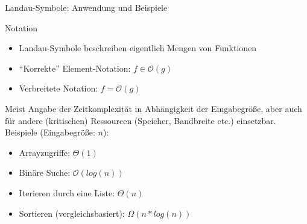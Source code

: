 \begin{frame}{Landau-Symbole: Anwendung und Beispiele}
	\begin{block}{Notation}
		\begin{itemize}
			\item Landau-Symbole beschreiben eigentlich Mengen von Funktionen
			\item \enquote{Korrekte} Element-Notation: $f \in \mathcal{O}(g)$
			\item Verbreitete Notation: $f = \mathcal{O}(g)$
		\end{itemize}
	\end{block}
	
	\pause
	
		Meist Angabe der Zeitkomplexität in Abhängigkeit der Eingabegröße, aber auch für andere (kritischen) Ressourcen (Speicher, Bandbreite etc.) einsetzbar. Beispiele (Eingabegröße: $n$):
		\begin{itemize}
			\item Arrayzugriffe: $\Theta(1)$
			\item Binäre Suche: $\mathcal{O}(log(n))$
			\item Iterieren durch eine Liste: $\Theta(n)$
			\item Sortieren (vergleichsbasiert): $\Omega(n*log(n))$
		\end{itemize}
\end{frame}

